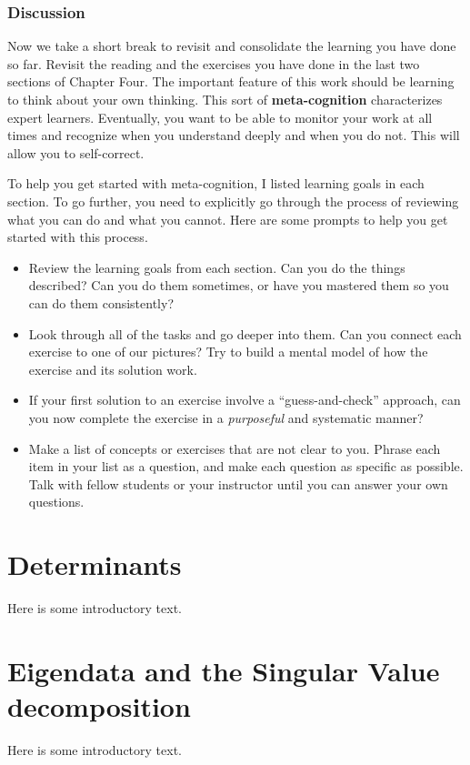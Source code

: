 \documentclass[10pt,]{book}
\newcommand{\terminology}[1]{\textbf{#1}}
\theoremstyle{plain}
\theoremstyle{definition}
\numberwithin{equation}{section}
\begin{document}
\subsection[Discussion]{Discussion}\label{subsection-114}
Now we take a short break to revisit and consolidate the learning you
      have done so far. Revisit the reading and the exercises you have done in
      the last two sections of Chapter Four. The important feature of this work should be
      learning to think about your own thinking. This sort of \terminology{meta-cognition}
      characterizes expert learners. Eventually, you want to be able to monitor
      your work at all times and recognize when you understand deeply and when
      you do not. This will allow you to self-correct.
\par
To help you get started with meta-cognition, I listed learning goals in
      each section. To go further, you need to explicitly go through the process
      of reviewing what you can do and what you cannot. Here are some prompts to
      help you get started with this process.
      \begin{itemize}
\item{}
          Review the learning goals from each section. Can you do the things
          described? Can you do them sometimes, or have you mastered them so you
          can do them consistently?
        \item{}
          Look through all of the tasks and go deeper into them. Can you
          connect each exercise to one of our pictures? Try to build a mental
          model of how the exercise and its solution work.
        \item{}
          If your first solution to an exercise involve a ``guess-and-check''
          approach, can you now complete the exercise in a \emph{purposeful}
          and systematic manner?
        \item{}
          Make a list of concepts or exercises that are not clear to you. Phrase
          each item in your list as a question, and make each question as
          specific as possible. Talk with fellow students or your
          instructor until you can answer your own questions.
        \end{itemize}

\clearpage
\typeout{************************************************}
\typeout{************************************************}
\chapter[Determinants]{Determinants}\label{chapter-determinants}
Here is some introductory text.\typeout{************************************************}
\typeout{************************************************}
\chapter[Eigendata and the Singular Value decomposition]{Eigendata and the Singular Value decomposition}\label{chapter-eigendata-and-svd}
Here is some introductory text.\appendix
\backmatter
\end{document}
